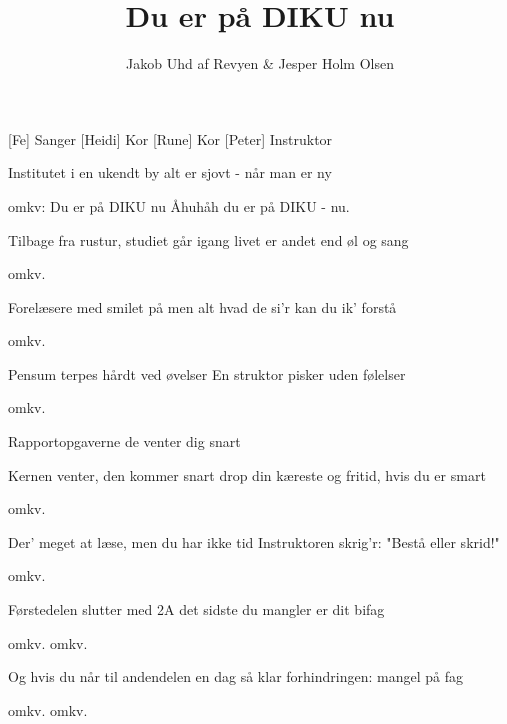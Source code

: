 \documentclass[a4paper,12pt]{article}
\title{Du er på DIKU nu}
\author{Jakob Uhd af Revyen \& Jesper Holm Olsen}
\begin{document}
\maketitle

\begin{roles}
[Fe] Sanger
[Heidi] Kor
[Rune] Kor
[Peter] Instruktor
\end{roles}

\begin{props}
\end{props}

\begin{song}

Institutet i en ukendt by
alt er sjovt - når man er ny

omkv:
Du er på DIKU nu
Åhuhåh du er på DIKU - nu.

Tilbage fra rustur, studiet går igang
livet er andet end øl og sang

omkv.

Forelæsere med smilet på
men alt hvad de si'r kan du ik' forstå

omkv.

Pensum terpes hårdt ved øvelser
En struktor pisker uden følelser

omkv.


Rapportopgaverne de venter dig snart


 Kernen venter, den kommer snart
drop din kæreste og fritid, hvis du er smart


omkv.

Der' meget at læse, men du har ikke tid
Instruktoren skrig'r: "Bestå eller skrid!"

omkv.

Førstedelen slutter med 2A
det sidste du mangler er dit bifag

omkv.
omkv.

Og hvis du når til andendelen en dag
så klar forhindringen: mangel på fag

omkv.
omkv.

\end{song}
\end{document}
